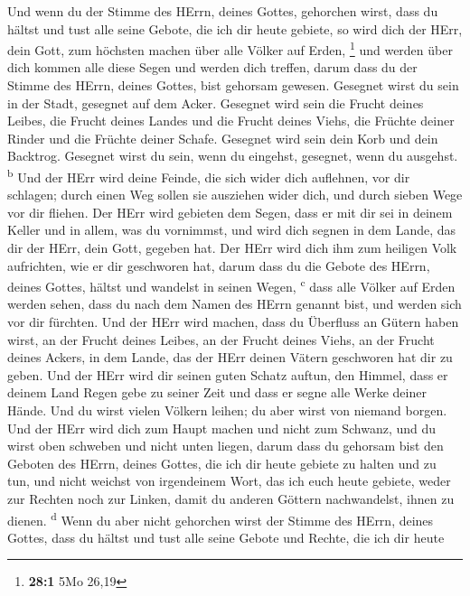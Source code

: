  Und wenn du der Stimme des HErrn, deines Gottes,
gehorchen wirst, dass du hältst und tust alle seine Gebote, die ich dir
heute gebiete, so wird dich der HErr, dein Gott, zum höchsten machen
über alle Völker auf Erden, \footnote{\textbf{28:1} 5Mo 26,19}
 und werden über dich kommen alle diese Segen und werden
dich treffen, darum dass du der Stimme des HErrn, deines Gottes, bist
gehorsam gewesen.  Gesegnet wirst du sein in der Stadt,
gesegnet auf dem Acker.  Gesegnet wird sein die Frucht
deines Leibes, die Frucht deines Landes und die Frucht deines Viehs, die
Früchte deiner Rinder und die Früchte deiner Schafe. 
Gesegnet wird sein dein Korb und dein Backtrog.  Gesegnet
wirst du sein, wenn du eingehst, gesegnet, wenn du ausgehst.
\textsuperscript{b}  Und der HErr wird deine Feinde, die
sich wider dich auflehnen, vor dir schlagen; durch einen Weg sollen sie
ausziehen wider dich, und durch sieben Wege vor dir fliehen.
 Der HErr wird gebieten dem Segen, dass er mit dir sei in
deinem Keller und in allem, was du vornimmst, und wird dich segnen in
dem Lande, das dir der HErr, dein Gott, gegeben hat.  Der
HErr wird dich ihm zum heiligen Volk aufrichten, wie er dir geschworen
hat, darum dass du die Gebote des HErrn, deines Gottes, hältst und
wandelst in seinen Wegen, \textsuperscript{c}  dass alle
Völker auf Erden werden sehen, dass du nach dem Namen des HErrn genannt
bist, und werden sich vor dir fürchten.  Und der HErr
wird machen, dass du Überfluss an Gütern haben wirst, an der Frucht
deines Leibes, an der Frucht deines Viehs, an der Frucht deines Ackers,
in dem Lande, das der HErr deinen Vätern geschworen hat dir zu geben.
 Und der HErr wird dir seinen guten Schatz auftun, den
Himmel, dass er deinem Land Regen gebe zu seiner Zeit und dass er segne
alle Werke deiner Hände. Und du wirst vielen Völkern leihen; du aber
wirst von niemand borgen.  Und der HErr wird dich zum
Haupt machen und nicht zum Schwanz, und du wirst oben schweben und nicht
unten liegen, darum dass du gehorsam bist den Geboten des HErrn, deines
Gottes, die ich dir heute gebiete zu halten und zu tun, 
und nicht weichst von irgendeinem Wort, das ich euch heute gebiete,
weder zur Rechten noch zur Linken, damit du anderen Göttern
nachwandelst, ihnen zu dienen. \textsuperscript{d}  Wenn
du aber nicht gehorchen wirst der Stimme des HErrn, deines Gottes, dass
du hältst und tust alle seine Gebote und Rechte, die ich dir heute
